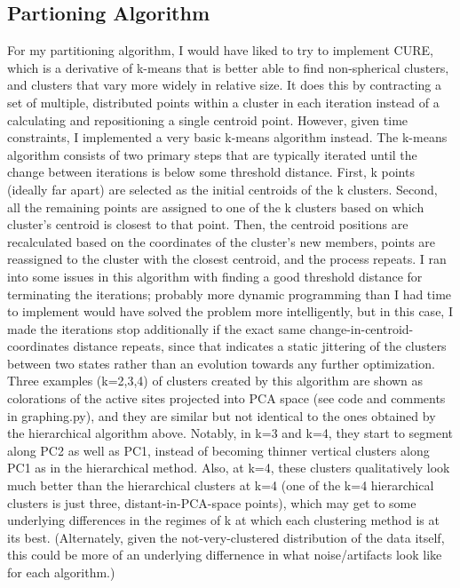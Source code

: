 \documentclass{article}
\begin{document}
\subsection{Partioning Algorithm}
For my partitioning algorithm, I would have liked to try to implement CURE, which is a derivative of k-means that is better able to find non-spherical clusters, and clusters that vary more widely in relative size. It does this by contracting a set of multiple, distributed points within a cluster in each iteration instead of a calculating and repositioning a single centroid point. However, given time constraints, I implemented a very basic k-means algorithm instead. The k-means algorithm consists of two primary steps that are typically iterated until the change between iterations is below some threshold distance. First, k points (ideally far apart) are selected as the initial centroids of the k clusters. Second, all the remaining points are assigned to one of the k clusters based on which cluster's centroid is closest to that point. Then, the centroid positions are recalculated based on the coordinates of the cluster's new members, points are reassigned to the cluster with the closest centroid, and the process repeats. I ran into some issues in this algorithm with finding a good threshold distance for terminating the iterations; probably more dynamic programming than I had time to implement would have solved the problem more intelligently, but in this case, I made the iterations stop additionally if the exact same change-in-centroid-coordinates distance repeats, since that indicates a static jittering of the clusters between two states rather than an evolution towards any further optimization. Three examples (k=2,3,4) of clusters created by this algorithm are shown as colorations of the active sites projected into PCA space (see code and comments in graphing.py), and they are similar but not identical to the ones obtained by the hierarchical algorithm above. Notably, in k=3 and k=4, they start to segment along PC2 as well as PC1, instead of becoming thinner vertical clusters along PC1 as in the hierarchical method. Also, at k=4, these clusters qualitatively look much better than the hierarchical clusters at k=4 (one of the k=4 hierarchical clusters is just three, distant-in-PCA-space points), which may get to some underlying differences in the regimes of k at which each clustering method is at its best. (Alternately, given the not-very-clustered distribution of the data itself, this could be more of an underlying differnence in what noise/artifacts look like for each algorithm.)
\end{document}

